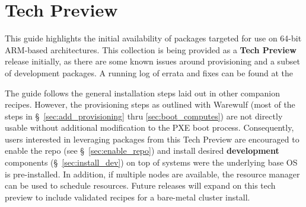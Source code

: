 \section{Tech Preview}

This guide highlights the initial availability of \OHPC{} packages targeted
for use on 64-bit ARM-based architectures. This collection is being provided as
a {\bf Tech Preview} release initially, as there are some known issues around
provisioning and a subset of development packages. A running log of errata and
fixes can be found at the
\href{https://github.com/openhpc/ohpc/wiki/ARM-Tech-Preview}{\color{blue}{ARM Tech Preview Wiki}}

The guide follows the general installation steps laid out in other companion
\OHPC{} recipes.  However, the provisioning steps as outlined with Warewulf
(most of the steps in \S~\ref{sec:add_provisioning} thru
\ref{sec:boot_computes}) are not directly usable without additional
modification to the PXE boot process.  Consequently, users interested in
leveraging packages from this Tech Preview are encouraged to enable the repo
(see \S~\ref{sec:enable_repo}) and install desired {\bf development}
components (\S~\ref{sec:install_dev}) on top of systems were the underlying
base OS is pre-installed. In addition, if multiple nodes are available, the
\rms{} resource manager can be used to schedule resources. Future \OHPC{} releases
will expand on this tech preview to include validated recipes for a bare-metal
cluster install. \\

